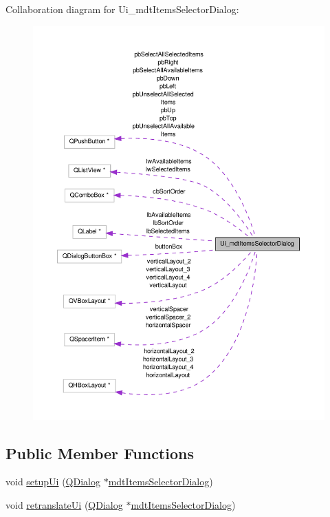 Collaboration diagram for Ui\-\_\-mdt\-Items\-Selector\-Dialog\-:\nopagebreak
\begin{figure}[H]
\begin{center}
\leavevmode
\includegraphics[width=350pt]{class_ui__mdt_items_selector_dialog__coll__graph}
\end{center}
\end{figure}
\subsection*{Public Member Functions}
\begin{DoxyCompactItemize}
\item 
void \hyperlink{class_ui__mdt_items_selector_dialog_adb513090c067d3f0a12bb03e54d3a086}{setup\-Ui} (\hyperlink{class_q_dialog}{Q\-Dialog} $\ast$\hyperlink{classmdt_items_selector_dialog}{mdt\-Items\-Selector\-Dialog})
\item 
void \hyperlink{class_ui__mdt_items_selector_dialog_ad6847c92e2b0c4a82cf2830ad9335b83}{retranslate\-Ui} (\hyperlink{class_q_dialog}{Q\-Dialog} $\ast$\hyperlink{classmdt_items_selector_dialog}{mdt\-Items\-Selector\-Dialog})
\end{DoxyCompactItemize}
